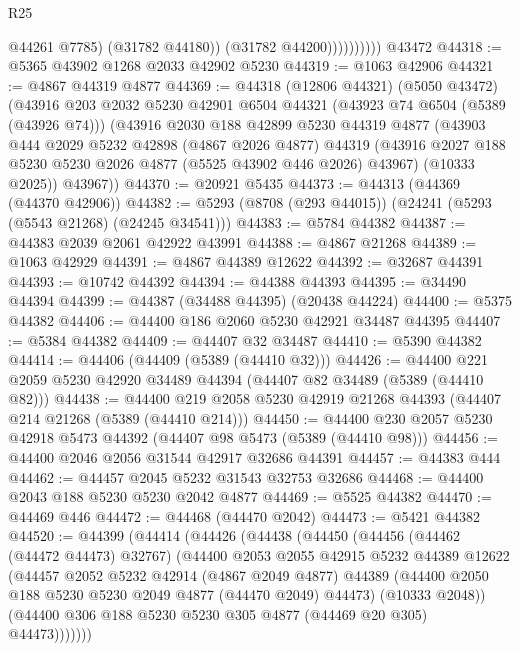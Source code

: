 \begin{lexlean}{R25}
\begin{coremodule}
                          @44261
                          @7785)
                        (@31782 @44180))
                      (@31782 @44200))))))))))
    @43472
@44318 := @5365 @43902 @1268 @2033 @42902 @5230
@44319 := @1063 @42906
@44321 := @4867 @44319 @4877
@44369 := @44318
    (@12806 @44321)
    (@5050 @43472)
    (@43916
      @203
      @2032
      @5230
      @42901
      @6504
      @44321
      (@43923 @74 @6504 (@5389 (@43926 @74)))
      (@43916
        @2030
        @188
        @42899
        @5230
        @44319
        @4877
        (@43903
          @444
          @2029
          @5232
          @42898
          (@4867 @2026 @4877)
          @44319
          (@43916 @2027 @188 @5230 @5230 @2026 @4877 (@5525 @43902 @446 @2026) @43967)
          (@10333 @2025))
        @43967))
@44370 := @20921 @5435
@44373 := @44313 (@44369 (@44370 @42906))
@44382 := @5293 (@8708 (@293 @44015)) (@24241 (@5293 (@5543 @21268) (@24245 @34541)))
@44383 := @5784 @44382
@44387 := @44383 @2039 @2061 @42922 @43991
@44388 := @4867 @21268
@44389 := @1063 @42929
@44391 := @4867 @44389 @12622
@44392 := @32687 @44391
@44393 := @10742 @44392
@44394 := @44388 @44393
@44395 := @34490 @44394
@44399 := @44387 (@34488 @44395) (@20438 @44224)
@44400 := @5375 @44382
@44406 := @44400 @186 @2060 @5230 @42921 @34487 @44395
@44407 := @5384 @44382
@44409 := @44407 @32 @34487
@44410 := @5390 @44382
@44414 := @44406 (@44409 (@5389 (@44410 @32)))
@44426 := @44400 @221 @2059 @5230 @42920 @34489 @44394 (@44407 @82 @34489 (@5389 (@44410 @82)))
@44438 := @44400 @219 @2058 @5230 @42919 @21268 @44393 (@44407 @214 @21268 (@5389 (@44410 @214)))
@44450 := @44400 @230 @2057 @5230 @42918 @5473 @44392 (@44407 @98 @5473 (@5389 (@44410 @98)))
@44456 := @44400 @2046 @2056 @31544 @42917 @32686 @44391
@44457 := @44383 @444
@44462 := @44457 @2045 @5232 @31543 @32753 @32686
@44468 := @44400 @2043 @188 @5230 @5230 @2042 @4877
@44469 := @5525 @44382
@44470 := @44469 @446
@44472 := @44468 (@44470 @2042)
@44473 := @5421 @44382
@44520 := @44399
    (@44414
      (@44426
        (@44438
          (@44450
            (@44456
              (@44462 (@44472 @44473) @32767)
              (@44400
                @2053
                @2055
                @42915
                @5232
                @44389
                @12622
                (@44457
                  @2052
                  @5232
                  @42914
                  (@4867 @2049 @4877)
                  @44389
                  (@44400 @2050 @188 @5230 @5230 @2049 @4877 (@44470 @2049) @44473)
                  (@10333 @2048))
                (@44400 @306 @188 @5230 @5230 @305 @4877 (@44469 @20 @305) @44473)))))))

\end{coremodule}
\end{lexlean}
